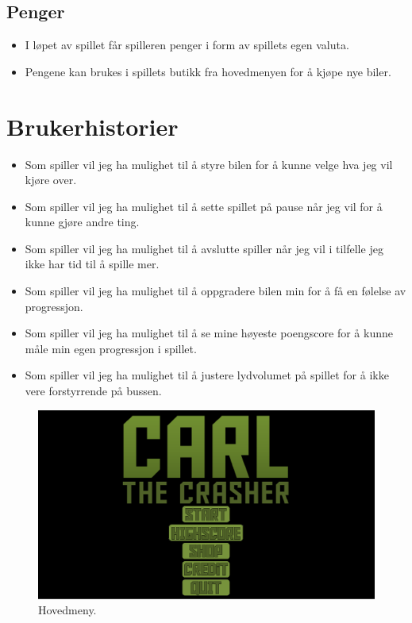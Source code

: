 \documentclass[paper=a4]{article}
\begin{document}
		\subsection{Penger}
		\begin{itemize}
			\item{I løpet av spillet får spilleren penger i form av spillets egen valuta.}
			\item{Pengene kan brukes i spillets butikk fra hovedmenyen for å kjøpe nye biler.}
		\end{itemize}

	\section{Brukerhistorier}
		\begin{itemize}
			\item{Som spiller vil jeg ha mulighet til å styre bilen for å kunne velge hva jeg vil kjøre over.}
			\item{Som spiller vil jeg ha mulighet til å sette spillet på pause når jeg vil for å kunne gjøre andre ting.}
			\item{Som spiller vil jeg ha mulighet til å avslutte spiller når jeg vil i tilfelle jeg ikke har tid til å spille mer.}
			\item{Som spiller vil jeg ha mulighet til å oppgradere bilen min for å få en følelse av progressjon.}
			\item{Som spiller vil jeg ha mulighet til å se mine høyeste poengscore for å kunne måle min egen progressjon i spillet.}
			\item{Som spiller vil jeg ha mulighet til å justere lydvolumet på spillet for å ikke vere forstyrrende på bussen.}
		\end{itemize}

	\newpage
	\begin{figure}\begin{center}
		\includegraphics[width=1.00\textwidth]{images/main_menu.PNG}
		\caption{Hovedmeny.}
	\end{center}\end{figure}
\end{document}
